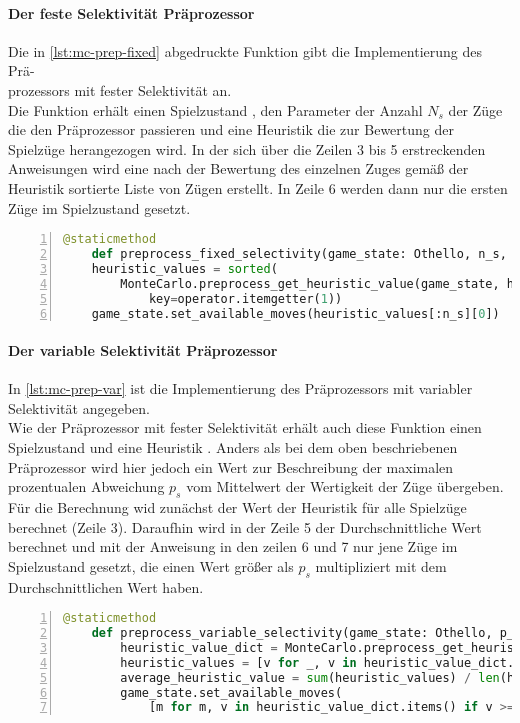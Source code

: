 \paragraph{Der feste Selektivität Präprozessor}
Die in \ref{lst:mc-prep-fixed} abgedruckte Funktion gibt die Implementierung des Prä-\\prozessors mit fester Selektivität an.
\\Die Funktion erhält einen Spielzustand , den Parameter  der Anzahl $N_{s}$ der Züge die den Präprozessor passieren und eine Heuristik  die zur Bewertung der Spielzüge herangezogen wird. In der sich über die Zeilen 3 bis 5 erstreckenden Anweisungen wird eine nach der Bewertung des einzelnen Zuges gemäß der Heuristik sortierte Liste von Zügen erstellt. In Zeile 6 werden dann nur die ersten  Züge im Spielzustand  gesetzt.
\begin{lstlisting}[caption = {Die Funktion \code{preprocess\_fixed\_slectivity}}, language = python, captionpos = t , numbers=left, label={lst:mc-prep-fixed}]
	@staticmethod	    
	def preprocess_fixed_selectivity(game_state: Othello, n_s, heuristic):
    heuristic_values = sorted(
        MonteCarlo.preprocess_get_heuristic_value(game_state, heuristic=heuristic).items(),
            key=operator.itemgetter(1))
    game_state.set_available_moves(heuristic_values[:n_s][0])
\end{lstlisting}
\paragraph{Der variable Selektivität Präprozessor}
In \ref{lst:mc-prep-var} ist die Implementierung des Präprozessors mit variabler Selektivität angegeben.
\\Wie der Präprozessor mit fester Selektivität erhält auch diese Funktion einen Spielzustand  und eine Heuristik . Anders als bei dem oben beschriebenen Präprozessor wird hier jedoch ein Wert  zur Beschreibung der maximalen prozentualen Abweichung $p_{s}$ vom Mittelwert der Wertigkeit der Züge übergeben.
\\Für die Berechnung wid zunächst der Wert der Heuristik für alle Spielzüge berechnet (Zeile 3). Daraufhin wird in der Zeile 5 der Durchschnittliche Wert berechnet und mit der Anweisung in den zeilen 6 und 7 nur jene Züge im Spielzustand gesetzt, die einen Wert größer als $p_{s}$ multipliziert mit dem Durchschnittlichen Wert haben.
\begin{lstlisting}[caption = {Die Funktion \code{preprocess\_variable\_slectivity}}, language = python, captionpos = t , numbers=left, label={lst:mc-prep-var}]
	@staticmethod
    def preprocess_variable_selectivity(game_state: Othello, p_s, heuristic):
        heuristic_value_dict = MonteCarlo.preprocess_get_heuristic_value(game_state, heuristic=heuristic)
        heuristic_values = [v for _, v in heuristic_value_dict.items()]
        average_heuristic_value = sum(heuristic_values) / len(heuristic_values)
        game_state.set_available_moves(
            [m for m, v in heuristic_value_dict.items() if v >= p_s * average_heuristic_value])
\end{lstlisting}
